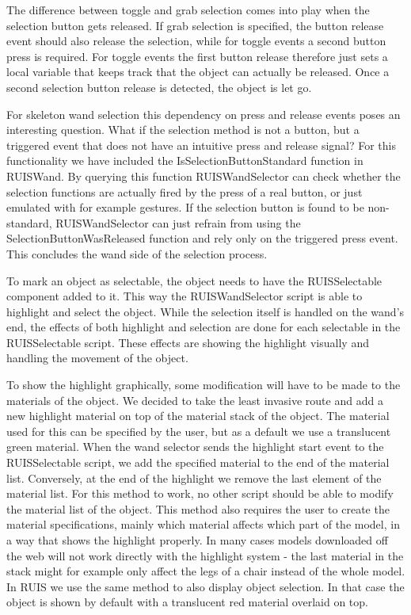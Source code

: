\documentclass[12pt,a4paper,oneside,pdftex]{report}
\begin{document}
The difference between toggle and grab selection comes into play when the selection button gets released. If grab selection is specified, the button release event should also release the selection, while for toggle events a second button press is required. For toggle events the first button release therefore just sets a local variable that keeps track that the object can actually be released. Once a second selection button release is detected, the object is let go. 

For skeleton wand selection this dependency on press and release events poses an interesting question. What if the selection method is not a button, but a triggered event that does not have an intuitive press and release signal? For this functionality we have included the IsSelectionButtonStandard function in RUISWand. By querying this function RUISWandSelector can check whether the selection functions are actually fired by the press of a real button, or just emulated with for example gestures. If the selection button is found to be non-standard, RUISWandSelector can just refrain from using the SelectionButtonWasReleased function and rely only on the triggered press event. This concludes the wand side of the selection process.

To mark an object as selectable, the object needs to have the RUISSelectable component added to it. This way the RUISWandSelector script is able to highlight and select the object. While the selection itself is handled on the wand's end, the effects of both highlight and selection are done for each selectable in the RUISSelectable script. These effects are showing the highlight visually and handling the movement of the object. 

To show the highlight graphically, some modification will have to be made to the materials of the object. We decided to take the least invasive route and add a new highlight material on top of the material stack of the object. The material used for this can be specified by the user, but as a default we use a translucent green material. When the wand selector sends the highlight start event to the RUISSelectable script, we add the specified material to the end of the material list. Conversely, at the end of the highlight we remove the last element of the material list. For this method to work, no other script should be able to modify the material list of the object. This method also requires the user to create the material specifications, mainly which material affects which part of the model, in a way that shows the highlight properly. In many cases models downloaded off the web will not work directly with the highlight system - the last material in the stack might for example only affect the legs of a chair instead of the whole model. In RUIS we use the same method to also display object selection. In that case the object is shown by default with a translucent red material overlaid on top.
\end{document}
